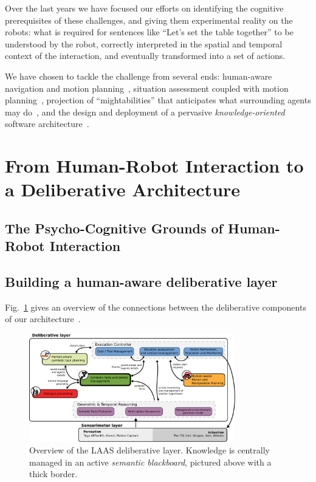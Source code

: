 \documentclass[preprint,5p]{elsarticle}
\begin{document}

Over the last years we have focused our efforts on identifying the cognitive
prerequisites of these challenges, and giving them experimental reality on the
robots: what is required for sentences like ``Let's set the table together''
to be understood by the robot, correctly interpreted in the spatial and
temporal context of the interaction, and eventually transformed into a set of
actions.

We have chosen to tackle the challenge from several ends: human-aware
navigation and motion planning~\cite{Mainprice2011}, situation assessment
coupled with motion planning~\cite{Mainprice2012}, projection of
``mightabilities'' that anticipates what surrounding agents may
do~\cite{Pandey2011}, and the design and deployment of a pervasive
\emph{knowledge-oriented} software architecture~\cite{Lemaignan2013}.

\section{From Human-Robot Interaction to a Deliberative Architecture}

\subsection{The Psycho-Cognitive Grounds of Human-Robot Interaction}
\label{sec:psychocognitivegrounds}


\subsection{Building a human-aware deliberative layer}


Fig.~\ref{fig|archi} gives an overview of the connections between the
deliberative components of our architecture~\cite{Alami2011}.

\begin{figure}
        \centering
        \includegraphics[width=0.8\textwidth]{archi}
        \caption{Overview of the LAAS deliberative layer. Knowledge is
        centrally managed in an active \emph{semantic blackboard}, pictured
        above with a thick border.}
        \label{fig|archi}
\end{figure}
\end{document}
